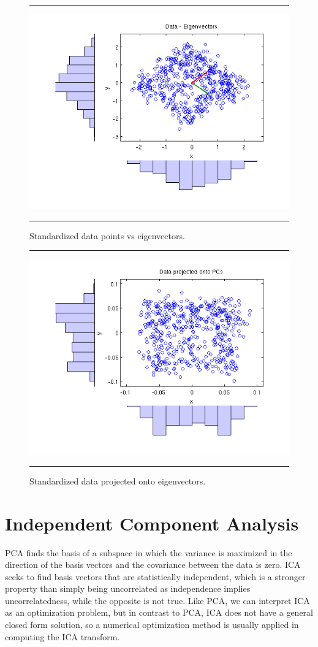 \documentclass[11pt, oneside, a4paper]{report}
\begin{document}
\begin{figure}  \label{pca_eigs}
  \centering
  \hrule
  \includegraphics[width = .9\textwidth]{Figures/pca_data_eigs}
  \hrule
  \caption{Standardized data points vs eigenvectors.}
\end{figure}

\begin{figure}\label{pca_project}
  \centering
  \hrule
  \includegraphics[width = .9\textwidth]{Figures/pca_eig_projection}
  \hrule
  \caption{Standardized data projected onto eigenvectors.}
\end{figure}


\chapter{Independent Component Analysis}\label{ica}


PCA finds the basis of a subspace in which the variance is
maximized in the direction of the basis vectors and the covariance
between the data is zero. ICA seeks to find basis
vectors that are statistically independent, which is a stronger
property than simply being uncorrelated as independence implies
uncorrelatedness, while the opposite is not true. 
Like PCA, we can interpret ICA as an optimization problem, but in
contrast to PCA, ICA does not have a general closed form solution, 
so a numerical optimization method is usually applied in
computing the ICA transform.
\end{document}
